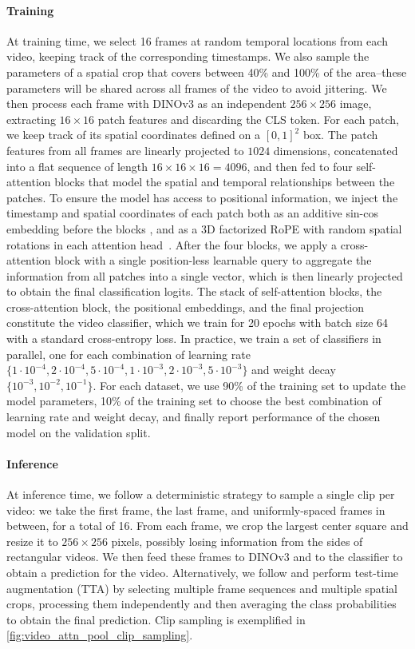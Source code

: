 \paragraph{Training}
At training time, we select 16 frames at random temporal locations from each video, keeping track of the corresponding timestamps.
We also sample the parameters of a spatial crop that covers between 40\% and 100\% of the area--these parameters will be shared across all frames of the video to avoid jittering.
We then process each frame with DINOv3 as an independent \(256{\times}256\) image, extracting \(16{\times}16\) patch features and discarding the CLS token.
For each patch, we keep track of its spatial coordinates defined on a \([0,1]^2\) box.
The patch features from all frames are linearly projected to \(1024\) dimensions, concatenated into a flat sequence of length \(16{\times}16{\times}16=4096\), and then fed to four self-attention blocks that model the spatial and temporal relationships between the patches.
To ensure the model has access to positional information, we inject the timestamp and spatial coordinates of each patch both as an additive sin-cos embedding before the blocks \citep{vaswani2017attention}, and as a 3D factorized RoPE with random spatial rotations in each attention head~\citep{heo2024rotary}.
After the four blocks, we apply a cross-attention block with a single position-less learnable query to aggregate the information from all patches into a single vector, which is then linearly projected to obtain the final classification logits.
The stack of self-attention blocks, the cross-attention block, the positional embeddings, and the final projection constitute the video classifier, which we train for 20 epochs with batch size 64 with a standard cross-entropy loss.
In practice, we train a set of classifiers in parallel, one for each combination of learning rate
\(\{1\cdot 10^{-4}, 2\cdot 10^{-4}, 5\cdot 10^{-4}, 1\cdot 10^{-3}, 2\cdot 10^{-3}, 5\cdot 10^{-3}\}\)
and weight decay
\(\{10^{-3}, 10^{-2}, 10^{-1}\}\).
For each dataset, we use 90\% of the training set to update the model parameters, 10\% of the training set to choose the best combination of learning rate and weight decay, and finally report performance of the chosen model on the validation split.

\paragraph{Inference}
At inference time, we follow a deterministic strategy to sample a single clip per video: we take the first frame, the last frame, and uniformly-spaced frames in between, for a total of 16.
From each frame, we crop the largest center square and resize it to \(256{\times}256\) pixels, possibly losing information from the sides of rectangular videos.
We then feed these frames to DINOv3 and to the classifier to obtain a prediction for the video.
Alternatively, we follow \citet{assran2025vjepa2} and perform test-time augmentation (TTA) by selecting multiple frame sequences and multiple spatial crops, processing them independently and then averaging the class probabilities to obtain the final prediction.
Clip sampling is exemplified in \cref{fig:video_attn_pool_clip_sampling}.

